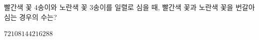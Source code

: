 \hspace*{2mm}\begin{minipage}[t]{\dimexpr\linewidth-2mm\relax}\vspace{0pt}
빨간색 꽃 $4$송이와 노란색 꽃 $3$송이를 일렬로 심을 때, 빨간색 꽃과 노란색 꽃을 번갈아 심는 경우의 수는? 
\begin{choices32}{$72$}{$108$}{$144$}{$216$}{$288$}\end{choices32}\end{minipage}
